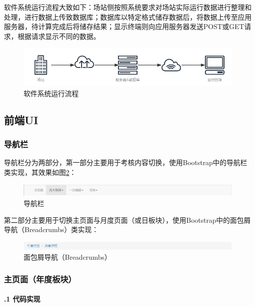 \documentclass[winfonts,UTF8,a4paper]{ctexart}
\begin{document}
软件系统运行流程大致如下：场站侧按照系统要求对场站实际运行数据进行整理和处理，进行数据上传致数据库；数据库以特定格式储存数据后，将数据上传至应用服务器，待计算完成后将储存结果；显示终端则向应用服务器发送POST或GET请求，根据请求显示不同的数据。

\begin{figure}[H]
	\centering
	\includegraphics[width=0.7\linewidth]{pic/软件系统示意图}
	\caption{软件系统运行流程}
	\label{软件系统运行流程}
\end{figure}
\subsection{前端UI}
\subsubsection{导航栏}
导航栏分为两部分，第一部分主要用于考核内容切换，使用Bootstrap中的导航栏类实现，其效果如图\ref{fig:screenshot026}：
\begin{figure}[H]
	\centering
	\includegraphics[width=0.7\linewidth]{pic/screenshot026}
	\caption{导航栏}
	\label{fig:screenshot026}
\end{figure}


第二部分主要用于切换主页面与月度页面（或日板块），使用Bootstrap中的面包屑导航（Breadcrumbs）类实现：
\begin{figure}[H]
	\centering
	\includegraphics[width=0.7\linewidth]{pic/screenshot027}
	\caption{面包屑导航（Breadcrumbs）}
	\label{fig:screenshot027}
\end{figure}

\subsubsection{主页面（年度板块）}

\paragraph{\thesubsubsection.1 代码实现}\ \\
\end{document}
